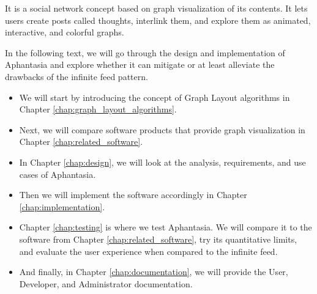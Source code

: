 It is a social network concept based on graph visualization of its contents.
It lets users create posts called thoughts, interlink them, and explore them as animated, interactive, and colorful graphs.

In the following text, we will go through the design and implementation of Aphantasia and
explore whether it can mitigate or at least alleviate the drawbacks of the infinite feed pattern.

\begin{itemize}
  \item We will start by introducing the concept of Graph Layout algorithms in Chapter \ref{chap:graph_layout_algorithms}.
  \item Next, we will compare software products that provide graph visualization in Chapter \ref{chap:related_software}.
  \item In Chapter \ref{chap:design}, we will look at the analysis, requirements, and use cases of Aphantasia.
  \item Then we will implement the software accordingly in Chapter \ref{chap:implementation}.
  \item Chapter \ref{chap:testing} is where we test Aphantasia.
 We will compare it to the software from Chapter \ref{chap:related_software},
 try its quantitative limits, and evaluate the user experience when compared to the infinite feed.
  \item And finally, in Chapter \ref{chap:documentation}, we will provide the User, Developer, and Administrator documentation.
\end{itemize}